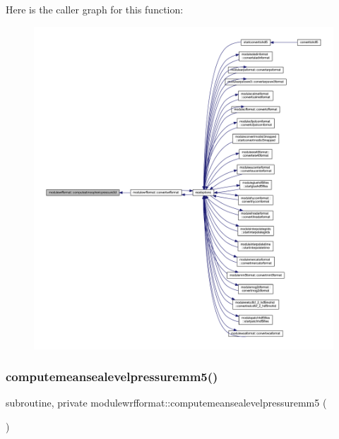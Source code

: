 Here is the caller graph for this function\+:\nopagebreak
\begin{figure}[H]
\begin{center}
\leavevmode
\includegraphics[width=350pt]{namespacemodulewrfformat_a58297fbd73eaef7ca87327428170f1aa_icgraph}
\end{center}
\end{figure}
\mbox{\label{namespacemodulewrfformat_ab2193cc6ab00a1375b87ea785f839b04}} 
\subsubsection{\texorpdfstring{computemeansealevelpressuremm5()}{computemeansealevelpressuremm5()}}
{\footnotesize\ttfamily subroutine, private modulewrfformat\+::computemeansealevelpressuremm5 (\begin{DoxyParamCaption}{ }\end{DoxyParamCaption})\hspace{0.3cm}{\ttfamily [private]}}

